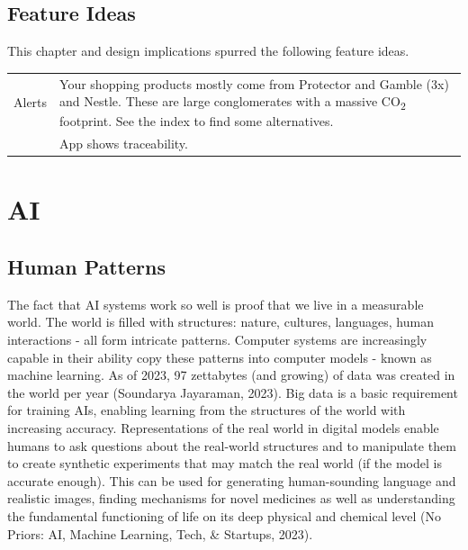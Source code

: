 \documentclass[
  letterpaper,
  DIV=11,
  numbers=noendperiod]{scrartcl}
\begin{document}
\subsection{Feature Ideas}\label{feature-ideas-2}

This chapter and design implications spurred the following feature
ideas.

\begin{longtable}[]{@{}
  >{\raggedright\arraybackslash}p{}
  >{\raggedright\arraybackslash}p{}@{}}
\toprule\noalign{}
\endhead
\bottomrule\noalign{}
\endlastfoot
Alerts & Your shopping products mostly come from Protector and Gamble
(3x) and Nestle. These are large conglomerates with a massive
CO\textsubscript{2} footprint. See the index to find some
alternatives. \\
& App shows traceability. \\
\end{longtable}

\newpage

\section{AI}\label{ai}

\subsection{Human Patterns}\label{human-patterns}

The fact that AI systems work so well is proof that we live in a
measurable world. The world is filled with structures: nature, cultures,
languages, human interactions - all form intricate patterns. Computer
systems are increasingly capable in their ability copy these patterns
into computer models - known as machine learning. As of 2023, 97
zettabytes (and growing) of data was created in the world per year
(Soundarya Jayaraman, 2023). Big data is a basic requirement for
training AIs, enabling learning from the structures of the world with
increasing accuracy. Representations of the real world in digital models
enable humans to ask questions about the real-world structures and to
manipulate them to create synthetic experiments that may match the real
world (if the model is accurate enough). This can be used for generating
human-sounding language and realistic images, finding mechanisms for
novel medicines as well as understanding the fundamental functioning of
life on its deep physical and chemical level (No Priors: AI, Machine
Learning, Tech, \& Startups, 2023).
\end{document}
